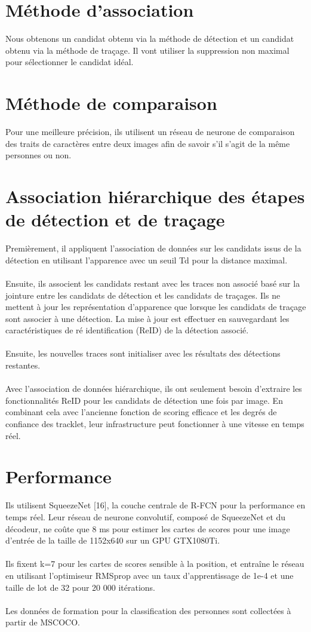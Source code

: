 \documentclass[11pt]{report}
\begin{document}
\section{Méthode d'association}
Nous obtenons un candidat obtenu via la méthode de détection et un candidat obtenu via la méthode de traçage. Il vont utiliser la suppression non maximal pour sélectionner le candidat idéal.\

\section{Méthode de comparaison}
Pour une meilleure précision, ils utilisent un réseau de neurone de comparaison des traits de caractères entre deux images afin de savoir s'il s'agit de la même personnes ou non.

\section{Association hiérarchique des étapes de détection et de traçage}
Premièrement, il appliquent l'association de données sur les candidats issus de la détection en utilisant l'apparence avec un seuil Td pour la distance maximal.\\\\
Ensuite, ils associent les candidats restant avec les traces non associé basé sur la jointure entre les candidats de détection et les candidats de traçages. Ils ne mettent à jour les représentation d'apparence que lorsque les candidats de traçage sont associer à une détection.
La mise à jour est effectuer en sauvegardant les caractéristiques de ré identification (ReID) de la détection associé. \\\\
Ensuite, les nouvelles traces sont initialiser avec les résultats des détections restantes.\\\\
Avec l'association de données hiérarchique, ils ont seulement besoin d'extraire les fonctionnalités ReID pour les candidats de détection une fois par image. En combinant cela avec l'ancienne fonction de scoring efficace et les degrés de confiance des tracklet, leur infrastructure peut fonctionner à une vitesse en temps réel.

\section{Performance}
Ils utilisent SqueezeNet [16], la couche centrale de R-FCN pour la performance en temps réel. Leur réseau de neurone convolutif, composé de SqueezeNet et du décodeur, ne coûte que 8 ms pour estimer les cartes de scores pour une image d'entrée de la taille de 1152x640 sur un GPU GTX1080Ti.\\\\
Ils fixent k=7 pour les cartes de scores sensible à la position, et entraîne le réseau en utilisant l'optimiseur RMSprop avec un taux d'apprentissage de 1e-4 et une taille de lot de 32 pour 20 000 itérations.\\\\
Les données de formation pour la classification des personnes sont collectées à partir de MSCOCO.
\end{document}
